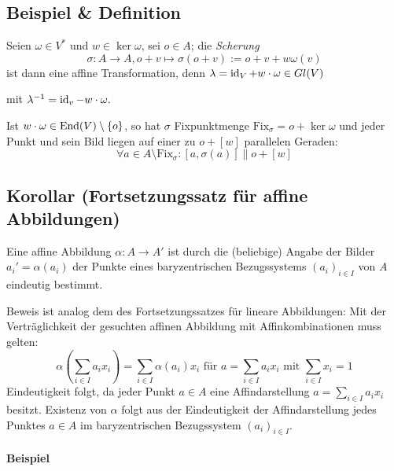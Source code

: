 \subsection{Beispiel \& Definition}
	\begin{Definition}[Scherung]
	Seien $ \omega\in V^* $ und $ w\in \ker \omega $, sei $ o\in A $; die \emph{Scherung}
		\[ \sigma:A\to A, o+v\mapsto \sigma(o+v):= o+v+w\omega(v) \]
	ist dann eine affine Transformation, denn\hfill
		$ \lambda = \operatorname{id}_V + w\cdot \omega \in Gl(V) $
		
	mit\hfill
		$ \lambda^{-1} = \operatorname{id}_v - w\cdot \omega. $
	
	Ist $ w\cdot\omega\in\operatorname{End}(V)\setminus\{o\} $, so hat $ \sigma $ Fixpunktmenge $ \text{Fix}_\sigma = o+\ker\omega $ und jeder Punkt und sein Bild liegen auf einer zu $ o+[w] $ parallelen Geraden:
		\[ \forall a\in A\setminus \text{Fix}_\sigma : [a,\sigma(a)] \parallel o+[w] \]
	\end{Definition}

\subsection{Korollar (Fortsetzungssatz für affine Abbildungen)}
	\begin{Korollar}
		Eine affine Abbildung $ \alpha:A\to A' $ ist durch die (beliebige) Angabe der Bilder $ a_i' = \alpha(a_i) $ der Punkte eines baryzentrischen Bezugssystems $ (a_i)_{i\in I} $ von $ A $ eindeutig bestimmt.
	\end{Korollar}
	Beweis ist analog dem des Fortsetzungssatzes für lineare Abbildungen: Mit der Verträglichkeit der gesuchten affinen Abbildung mit Affinkombinationen muss gelten:
		\[ \alpha\left(\sum_{i\in I}a_ix_i\right)=\sum_{i\in I}\alpha(a_i)x_i \text{ für } a =\sum_{i\in I}a_ix_i \text{ mit } \sum_{i\in I}x_i = 1 \]
	Eindeutigkeit folgt, da jeder Punkt $ a\in A $ eine Affindarstellung $ a = \sum_{i\in I}a_ix_i $ besitzt. Existenz von $ \alpha $ folgt aus der Eindeutigkeit der Affindarstellung jedes Punktes $ a\in A $ im baryzentrischen Bezugssystem $ (a_i)_{i\in I} $.
	
	\paragraph{Beispiel}
    
